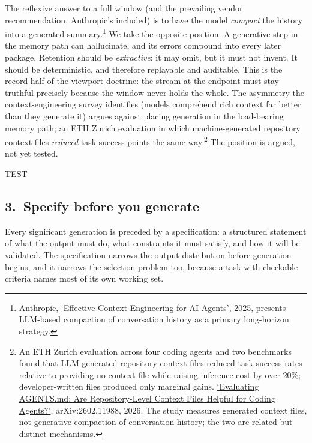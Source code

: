 \documentclass[11pt, a4paper]{article}
\newcommand{\principletest}[1]{%
  \par\vskip3pt\noindent
  {\labelfont\fontsize{8}{10}\selectfont\color{indigo}TEST}\hspace{7pt}{\itshape #1}\par}
\begin{document}
The reflexive answer to a full window (and the prevailing vendor recommendation,
Anthropic's included) is to have the model \emph{compact} the history into a generated
summary.\footnote{Anthropic, \href{https://www.anthropic.com/engineering/effective-context-engineering-for-ai-agents}{`Effective
Context Engineering for AI Agents'}, 2025, presents LLM-based compaction of conversation
history as a primary long-horizon strategy.} We take the opposite position. A generative
step in the memory path can hallucinate, and its errors compound into every later
package. Retention should be \emph{extractive}: it may omit, but it must not
invent. It should be deterministic, and therefore replayable and auditable. This is the
record half of the viewport doctrine: the stream at the endpoint must stay truthful
precisely because the window never holds the whole. The asymmetry the context-engineering
survey identifies (models comprehend rich context far better than they generate
it) argues against placing generation in the load-bearing memory path; an ETH Zurich
evaluation in which machine-generated repository context files \emph{reduced} task
success points the same way.\footnote{An ETH Zurich evaluation across four coding agents and two
benchmarks found that LLM-generated repository context files reduced task-success rates
relative to providing no context file while raising inference cost by over 20\%;
developer-written files produced only marginal gains.
\href{https://arxiv.org/abs/2602.11988}{`Evaluating AGENTS.md: Are Repository-Level
Context Files Helpful for Coding Agents?'}, arXiv:2602.11988, 2026. The study measures
generated context files, not generative compaction of conversation history; the two are
related but distinct mechanisms.} The position is argued, not yet tested.

\principletest{If condensation can produce a sentence no source ever wrote, every future retrieval can inherit the invention.}

\subsection*{3.~Specify before you generate}

Every significant generation is preceded by a specification: a structured statement of what
the output must do, what constraints it must satisfy, and how it will be validated. The
specification narrows the output distribution before generation begins, and it narrows the
selection problem too, because a task with checkable criteria names most of its own working
set.
\end{document}
